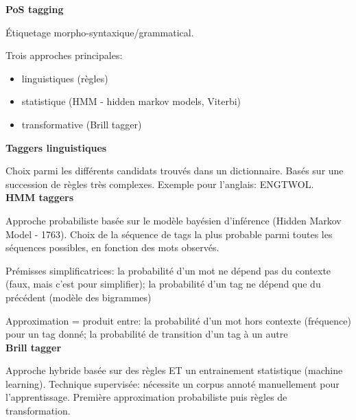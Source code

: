 \textbf{PoS tagging}

Étiquetage morpho-syntaxique/grammatical.

Trois approches principales:
\begin{itemize}
    \item linguistiques (règles)
    \item statistique (HMM - hidden markov models, Viterbi)
    \item transformative (Brill tagger)\\
\end{itemize}

\textbf{Taggers linguistiques}

Choix parmi les différents candidats trouvés dans un dictionnaire. Basés sur une succession de règles très complexes. Exemple pour l'anglais: ENGTWOL.\\

\textbf{HMM taggers}

Approche probabiliste basée sur le modèle bayésien d'inférence (Hidden Markov Model - 1763). Choix de la séquence de tags la plus probable parmi toutes les séquences possibles, en fonction des mots observés.

Prémisses simplificatrices: la probabilité d'un mot ne dépend pas du contexte (faux, mais c'est pour simplifier); la probabilité d'un tag ne dépend que du précédent (modèle des bigrammes)

Approximation = produit entre: la probabilité d'un mot hors contexte (fréquence) pour un tag donné; la probabilité de transition d'un tag à un autre\\

\textbf{Brill tagger}

Approche hybride basée sur des règles ET un entrainement statistique (machine learning). Technique supervisée: nécessite un corpus annoté manuellement pour l'apprentissage. Première approximation probabiliste puis règles de transformation.
